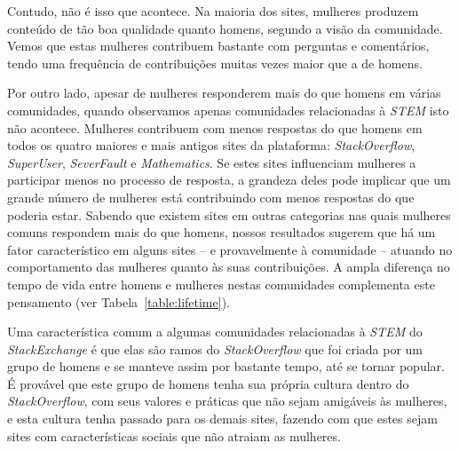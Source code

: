 Contudo, não é isso que acontece. Na maioria dos sites, mulheres produzem conteúdo de tão boa qualidade quanto homens, segundo a visão da comunidade. Vemos que estas mulheres contribuem bastante com perguntas e comentários, tendo uma frequência de contribuições muitas vezes maior que a de homens. 



Por outro lado, apesar de mulheres responderem mais do que homens em várias comunidades, quando observamos apenas comunidades relacionadas à \emph{STEM} isto não acontece. Mulheres contribuem com menos respostas do que homens em todos os quatro maiores e mais antigos sites da plataforma: \emph{StackOverflow}, \emph{SuperUser}, \emph{SeverFault} e \emph{Mathematics}. Se estes sites influenciam mulheres a participar menos no processo de resposta, a grandeza deles pode implicar que um grande número de mulheres está contribuindo com menos respostas do que poderia estar. Sabendo que existem sites em outras categorias nas quais mulheres comuns respondem mais do que homens, nossos resultados sugerem que há um fator característico em alguns sites -- e provavelmente à comunidade -- atuando no comportamento das mulheres quanto às suas contribuições. A ampla diferença no tempo de vida entre homens e mulheres nestas comunidades complementa este pensamento (ver Tabela~\ref{table:lifetime}).

Uma característica comum a algumas comunidades relacionadas à \emph{STEM} do \emph{StackExchange} é que elas são ramos do \emph{StackOverflow} que foi criada por um grupo de homens e se manteve assim por bastante tempo, até se tornar popular. É provável que este grupo de homens tenha sua própria cultura dentro do \emph{StackOverflow}, com seus valores e práticas que não sejam amigáveis às mulheres, e esta cultura tenha passado para os demais sites, fazendo com que estes sejam sites com características sociais que não atraiam as mulheres.


